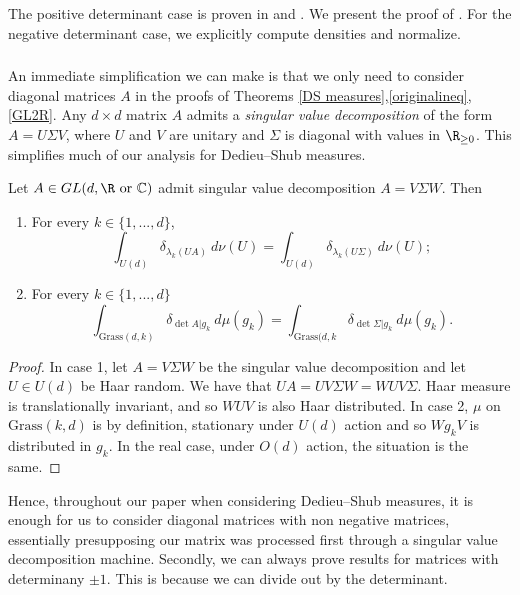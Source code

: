 \documentclass[10pt]{amsart}
\numberwithin{equation}{section}     %
\newcommand{\C}{\mathbb{C}}
\newcommand{\Grass}{\mathrm{Grass}}
\begin{document}
The positive determinant case is proven in \cite{pujals2006expanding} and \cite{ledrappier2003random}. We present the proof of \cite{pujals2006expanding}. For the negative determinant case, we explicitly compute densities and normalize. 

\subsubsection{}
An immediate simplification we can make is that we  only need to consider diagonal matrices $A$ in the proofs of Theorems \ref{DS measures},\ref{originalineq}, 
\ref{GL2R}. Any $d \times d$ matrix $A$ admits a \textit{singular value decomposition} of the form $A = U \Sigma V$, where $U$ and $V$ are unitary and $\Sigma$ is diagonal with values in $\R_{\geq 0}$. This simplifies much of our analysis for Dedieu--Shub measures. 

\begin{lemma}     \label{SVD}
    Let $A \in GL(d,\R \text{ or }\C)$ admit singular value decomposition $A = V \Sigma W$. Then \begin{enumerate}
        \item[1.] For every $k \in \{1,...,d\}$, $$\int_{U(d)} \delta_{\lambda_k(UA) } \ d\nu(U) = \int_{U(d)} \delta_{\lambda_k(U\Sigma)} \ d\nu(U);$$ 
        \item[2.] For every $k \in \{1,...,d\}$ $$\int_{\Grass(d,k)} \delta_{\det A|g_k} \ d\mu(g_k) = \int_{\Grass(d,k} \delta_{\det \Sigma|g_k} \ d\mu(g_k). $$ 
    \end{enumerate}
\end{lemma}

\begin{proof}
    In case 1, let $A = V \Sigma W$ be the singular value decomposition and let $U \in U(d)$ be Haar random. We have that $UA = UV\Sigma W = WUV \Sigma$. Haar measure is translationally invariant, and so $WUV$ is also Haar distributed. In case 2, $\mu$ on $\text{Grass}(k,d)$ is by definition, stationary under $U(d)$ action and so $W g_k V$ is distributed in $g_k$. In the real case, under $O(d)$ action, the situation is the same. 
\end{proof}

Hence, throughout our paper when considering Dedieu--Shub measures, it is enough for us to consider diagonal matrices with non negative matrices, essentially presupposing our matrix was processed first through a singular value decomposition machine. Secondly, we can always prove results for matrices with determinany $\pm 1$. This is because we can divide out by the determinant. 
 
\end{document}
